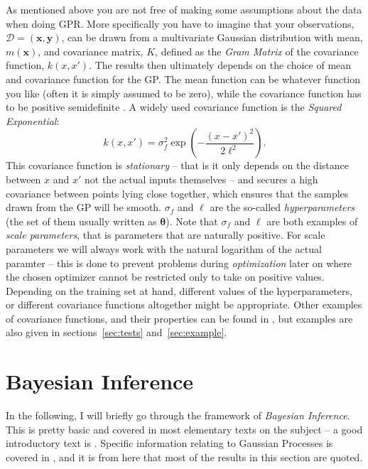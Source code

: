\documentclass[a4paper,11pt,article,oneside]{memoir}
\begin{document}
As mentioned above you are not free of making some assumptions about the data when doing GPR. More specifically you have to imagine that your observations, $\mathcal{D} = (\mathbf{x},\mathbf{y})$, can be drawn from a multivariate Gaussian distribution with mean, $m(\mathbf{x})$, and covariance matrix, $K$, defined as the \emph{Gram Matrix} of the covariance function, $k(x,x')$\cite{wiki:gram}. The results then ultimately depends on the choice of mean and covariance function for the GP. The mean function can be whatever function you like (often it is simply assumed to be zero), while the covariance function has to be positive semidefinite \cite[Chapter~4]{rasmussen2006}. A widely used covariance function is the \emph{Squared Exponential}:
%
\begin{equation}
k(x,x') = \sigma_f^2 \exp\left( -\frac{(x-x')^2}{2\ell^2}\right).
\label{eq:se}
\end{equation}
%
This covariance function is \emph{stationary} -- that is it only depends on the distance between $x$ and $x'$ not the actual inputs themselves -- and secures a high covariance between points lying close together, which ensures that the samples drawn from the GP will be smooth. $\sigma_f$ and $\ell$ are the so-called \emph{hyperparameters} (the set of them usually written as $\boldsymbol{\theta}$). Note that $\sigma_f$ and $\ell$ are both examples of \emph{scale parameters}, that is parameters that are naturally positive. For scale parameters we will always work with the natural logarithm of the actual paramter -- this is done to prevent problems during \emph{optimization} later on where the chosen optimizer cannot be restricted only to take on positive values. Depending on the training set at hand, different values of the hyperparameters, or different covariance functions altogether might be appropriate. Other examples of covariance functions, and their properties can be found in \cite[Chapter~4]{rasmussen2006}, but  examples are also given in sections~\ref{sec:tests} and~\ref{sec:example}.

\section{Bayesian Inference}
In the following, I will briefly go through the framework of \emph{Bayesian Inference}. This is pretty basic and covered in most elementary texts on the subject -- a good introductory text is \cite{gregory2005}. Specific information relating to Gaussian Processes is covered in \cite[Chapter~2]{rasmussen2006}, and it is from here that most of the results in this section are quoted.
\end{document}
